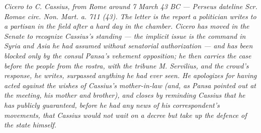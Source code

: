 
\textit{Cicero to C. Cassius, from Rome around 7 March 43 BC ---
Perseus dateline \textit{Scr. Romae circ. Non. Mart. a. 711 (43)}. The
letter is the report a politician writes to a partisan in the field
after a hard day in the chamber. Cicero has moved in the Senate to
recognize Cassius's standing --- the implicit issue is the command in
Syria and Asia he had assumed without senatorial authorization --- and
has been blocked only by the consul Pansa's vehement opposition; he
then carries the case before the people from the rostra, with the
tribune M. Servilius, and the crowd's response, he writes, surpassed
anything he had ever seen. He apologizes for having acted against the
wishes of Cassius's mother-in-law (and, as Pansa pointed out at the
meeting, his mother and brother), and closes by reminding Cassius that
he has publicly guaranteed, before he had any news of his correspondent's
movements, that Cassius would not wait on a decree but take up the
defence of the state himself.}
